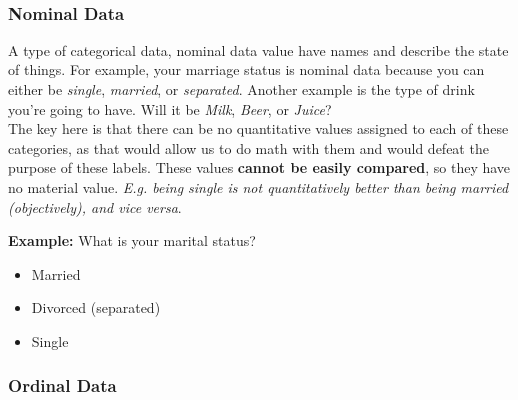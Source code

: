 \documentclass[english, 10pt]{article}
\begin{document}
{ \\
}

\subsubsection{Nominal Data}

A type of categorical data, nominal data value have names and describe the state of things. For example, your marriage status is nominal data because you can either be \textit{single}, \textit{married}, or \textit{separated}. Another example is the type of drink you're going to have. Will it be \textit{Milk}, \textit{Beer}, or \textit{Juice}?\\

The key here is that there can be no quantitative values assigned to each of these categories, as that would allow us to do math with them and would defeat the purpose of these labels. These values \textbf{cannot be easily compared}, so they have no material value. \textit{E.g. being single is not quantitatively better than being married (objectively), and vice versa}.\\

\begin{myproof}
\textbf{Example:} What is your marital status?
\begin{itemize}
	\item Married
	\item Divorced (separated)
	\item Single
\end{itemize}
\end{myproof}

\subsubsection{Ordinal Data}
\end{document}
